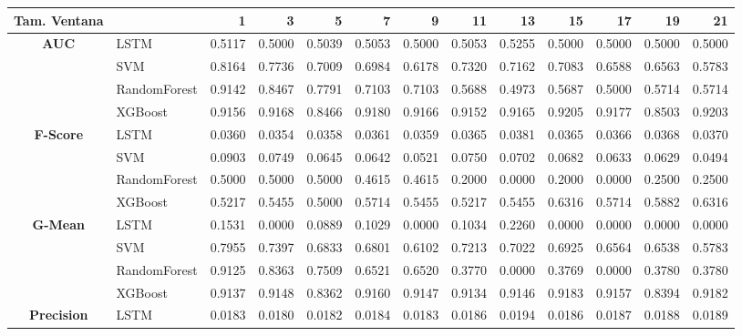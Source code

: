 \begin{table}[h]
	\centering
	\begin{adjustbox}{max width=15cm}
		\begin{tabular}{|c|l|r|r|r|r|r|r|r|r|r|r|r|}
			\hline
			\textbf{Tam. Ventana} &         &      1  &      3  &      5  &      7  &      9  &      11 &      13 &      15 &      17 &      19 &      21 \\
			\hline
			\textbf{AUC} & LSTM &  0.5117 &  0.5000 &  0.5039 &  0.5053 &  0.5000 &  0.5053 &  0.5255 &  0.5000 &  0.5000 &  0.5000 &  0.5000 \\
			& SVM &  0.8164 &  0.7736 &  0.7009 &  0.6984 &  0.6178 &  0.7320 &  0.7162 &  0.7083 &  0.6588 &  0.6563 &  0.5783 \\
			& RandomForest &  0.9142 &  0.8467 &  0.7791 &  0.7103 &  0.7103 &  0.5688 &  0.4973 &  0.5687 &  0.5000 &  0.5714 &  0.5714 \\
			& XGBoost &  0.9156 &  0.9168 &  0.8466 &  0.9180 &  0.9166 &  0.9152 &  0.9165 &  0.9205 &  0.9177 &  0.8503 &  0.9203 \\
			\hline
			\textbf{F-Score} & LSTM &  0.0360 &  0.0354 &  0.0358 &  0.0361 &  0.0359 &  0.0365 &  0.0381 &  0.0365 &  0.0366 &  0.0368 &  0.0370 \\
			& SVM &  0.0903 &  0.0749 &  0.0645 &  0.0642 &  0.0521 &  0.0750 &  0.0702 &  0.0682 &  0.0633 &  0.0629 &  0.0494 \\
			& RandomForest &  0.5000 &  0.5000 &  0.5000 &  0.4615 &  0.4615 &  0.2000 &  0.0000 &  0.2000 &  0.0000 &  0.2500 &  0.2500 \\
			& XGBoost &  0.5217 &  0.5455 &  0.5000 &  0.5714 &  0.5455 &  0.5217 &  0.5455 &  0.6316 &  0.5714 &  0.5882 &  0.6316 \\
			\hline
			\textbf{G-Mean} & LSTM &  0.1531 &  0.0000 &  0.0889 &  0.1029 &  0.0000 &  0.1034 &  0.2260 &  0.0000 &  0.0000 &  0.0000 &  0.0000 \\
			& SVM &  0.7955 &  0.7397 &  0.6833 &  0.6801 &  0.6102 &  0.7213 &  0.7022 &  0.6925 &  0.6564 &  0.6538 &  0.5783 \\
			& RandomForest &  0.9125 &  0.8363 &  0.7509 &  0.6521 &  0.6520 &  0.3770 &  0.0000 &  0.3769 &  0.0000 &  0.3780 &  0.3780 \\
			& XGBoost &  0.9137 &  0.9148 &  0.8362 &  0.9160 &  0.9147 &  0.9134 &  0.9146 &  0.9183 &  0.9157 &  0.8394 &  0.9182 \\
			\hline
			\textbf{Precision} & LSTM &  0.0183 &  0.0180 &  0.0182 &  0.0184 &  0.0183 &  0.0186 &  0.0194 &  0.0186 &  0.0187 &  0.0188 &  0.0189 \\

\end{tabular}
\end{adjustbox}
\end{table}
